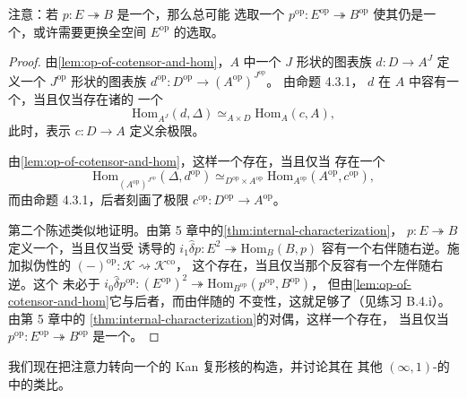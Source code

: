 注意：若 $p\colon E\twoheadrightarrow B$ 是一个\trIsofibration，那么总可能
选取一个\trFunctor{}
$p^{\mathrm{op}}\colon E^{\mathrm{op}}\twoheadrightarrow B^{\mathrm{op}}$
使其仍是一个\trIsofibration，或许需要更换全空间 $E^{\mathrm{op}}$ 的选取。

\begin{proof}
由\cref{lem:op-of-cotensor-and-hom}，$A$ 中一个 $J$ 形状的图表族
$d\colon D\to A^{J}$ 定义一个 $J^{\mathrm{op}}$ 形状的图表族
$d^{\mathrm{op}}\colon D^{\mathrm{op}}\to(A^{\mathrm{op}})^{J^{\mathrm{op}}}$。
由命题 4.3.1，%
$d$ 在 $A$ 中容有一个\trColimit，当且仅当存在诸\trCommaInfinityCategory{}的
一个\trEquivalence
\begin{equation*}
\mathrm{Hom}_{A^{J}}(d,\Delta)\simeq_{A\times D}\mathrm{Hom}_{A}(c,A),
\end{equation*}
此时，表示\trFunctor{} $c\colon D\to A$ 定义余极限\trFunctor。

由\cref{lem:op-of-cotensor-and-hom}，这样一个\trEquivalence{}存在，当且仅当
存在一个\trEquivalence
\begin{equation*}
\mathrm{Hom}_{(A^{\mathrm{op}})^{J^{\mathrm{op}}}}(\Delta,d^{\mathrm{op}})
\simeq_{D^{\mathrm{op}}\times A^{\mathrm{op}}}
\mathrm{Hom}_{A^{\mathrm{op}}}(A^{\mathrm{op}},c^{\mathrm{op}}),
\end{equation*}
而由命题 4.3.1，后者刻画了极限\trFunctor{}
$c^{\mathrm{op}}\colon D^{\mathrm{op}}\to A^{\mathrm{op}}$。

第二个陈述类似地证明。由第 5 章中的\cref{thm:internal-characterization}，
$p\colon E\twoheadrightarrow B$ 定义一个\trCartesianFibration，当且仅当受
诱导的\trFunctor{}
$i_{1}\hat{\delta}p\colon E^{2}\twoheadrightarrow\mathrm{Hom}_{B}(B,p)$
容有一个右伴随右逆。施加拟伪\trFunctor{}性的\trBiequivalence{}
$(-)^{\mathrm{op}}\colon\mathcal{K}\rightsquigarrow\mathcal{K}^{\mathrm{co}}$，
这个\trAdjunction{}存在，当且仅当那个反\trFunctor{}容有一个左伴随右逆。这个%
\trFunctor{}未必\trIsomorphism{}于
$i_{0}\hat{\delta}p^{\mathrm{op}}\colon(E^{\mathrm{op}})^{2}\twoheadrightarrow\mathrm{Hom}_{B^{\mathrm{op}}}(p^{\mathrm{op}},B^{\mathrm{op}})$，
但由\cref{lem:op-of-cotensor-and-hom}它与后者\trEquivalence{}，而由伴随的%
\trEquivalence{}不变性，这就足够了（见练习 B.4.i）。由第 5 章中的%
\cref{thm:internal-characterization}的对偶，这样一个\trAdjunction{}存在，
当且仅当 $p^{\mathrm{op}}\colon E^{\mathrm{op}}\twoheadrightarrow B^{\mathrm{op}}$
是一个\trCocartesianFibration。
\end{proof}

我们现在把注意力转向一个\trQuasiCategory{}的 Kan 复形核的构造，并讨论其在
其他 $(\infty,1)$-\trCategory{}的\trInfinityCosmos{}中的类比。

